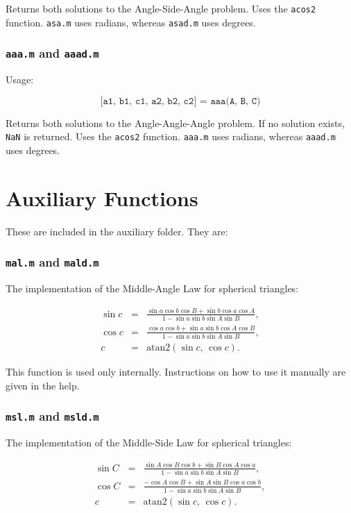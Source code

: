 \documentclass{report}
\begin{document}
Returns both solutions to the Angle-Side-Angle problem. Uses the
\texttt{acos2} function. \texttt{asa.m} uses radians, whereas
\texttt{asad.m} uses degrees.

\subsubsection{\texttt{aaa.m} and \texttt{aaad.m}}
Usage:

\[
         \texttt{[a1, b1, c1, a2, b2, c2] = aaa(A, B, C)}
\]

Returns both solutions to the Angle-Angle-Angle problem. If no
solution exists, \texttt{NaN} is returned. Uses the \texttt{acos2}
function. \texttt{aaa.m} uses radians, whereas \texttt{aaad.m}
uses degrees.

\section*{Auxiliary Functions}
These are included in the auxiliary folder. They are:

\subsubsection{\texttt{mal.m} and \texttt{mald.m}}
The implementation of the Middle-Angle Law for spherical
triangles:

\begin{eqnarray*}
\sin c &=& \frac{\sin a\cos b\cos B + \sin b \cos a \cos A}
{1-\sin a \sin b \sin A \sin B},\\
\cos c &=& \frac{\cos a\cos b + \sin a \sin b \cos A\cos B}
{1-\sin a \sin b \sin A \sin B},\\
c &=& \text{atan2}(\sin c,\,\cos c).
\end{eqnarray*}

This function is used only internally. Instructions on how to use
it manually are given in the help.

\subsubsection{\texttt{msl.m} and \texttt{msld.m}}
The implementation of the Middle-Side Law for spherical triangles:

\begin{eqnarray*}
\sin C &=& \frac{\sin A\cos B\cos b + \sin B \cos A \cos a}
{1-\sin a \sin b \sin A \sin B},\\
\cos C &=& \frac{-\cos A\cos B + \sin A \sin B \cos a\cos b}
{1-\sin a \sin b \sin A \sin B},\\
c &=& \text{atan2}(\sin c,\,\cos c).
\end{eqnarray*}
\end{document}
